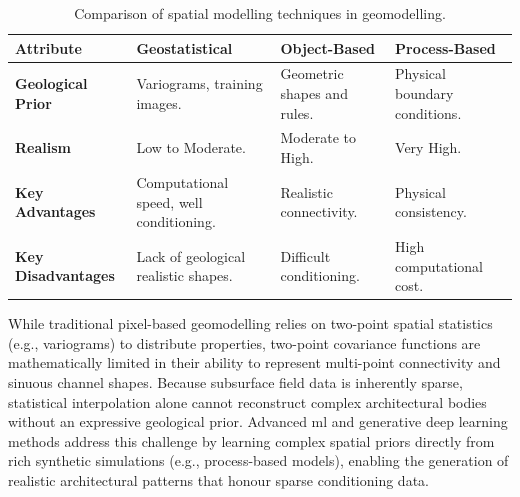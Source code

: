 \begin{table}[htbp]
    \centering
    \renewcommand{\arraystretch}{1.5}
    \begin{tabular}{p{} p{} p{} p{}}
        \hline
        \textbf{Attribute} & \textbf{Geostatistical} & \textbf{Object-Based} & \textbf{Process-Based} \\
        \hline
        \textbf{Geological Prior} & Variograms, training images. & Geometric shapes and rules. & Physical boundary conditions. \\
        \textbf{Realism} & Low to Moderate. & Moderate to High. & Very High. \\
        \textbf{Key Advantages} & Computational speed, well conditioning. & Realistic connectivity. & Physical consistency. \\
        \textbf{Key Disadvantages} & Lack of geological realistic shapes. & Difficult conditioning. & High computational cost. \\
        \hline
    \end{tabular}
    \caption{Comparison of spatial modelling techniques in geomodelling.}\label{tab:Geomodelling_comparison}
\end{table}
While traditional pixel-based geomodelling relies on two-point spatial statistics (e.g., variograms) to distribute properties, two-point covariance functions are mathematically limited in their ability to represent multi-point connectivity and sinuous channel shapes. Because subsurface field data is inherently sparse, statistical interpolation alone cannot reconstruct complex architectural bodies without an expressive geological prior. Advanced \gls{ml} and generative deep learning methods address this challenge by learning complex spatial priors directly from rich synthetic simulations (e.g., process-based models), enabling the generation of realistic architectural patterns that honour sparse conditioning data.


